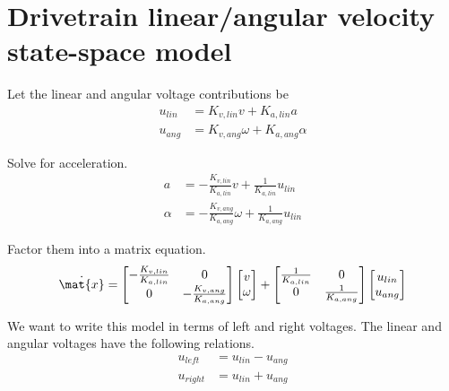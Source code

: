 \section{Drivetrain linear/angular velocity state-space model}

Let the linear and angular voltage contributions be
\begin{align*}
  u_{lin} &= K_{v,lin} v + K_{a,lin} a \\
  u_{ang} &= K_{v,ang} \omega + K_{a,ang} \alpha
\end{align*}

Solve for acceleration.
\begin{align*}
  a &= -\frac{K_{v,lin}}{K_{a,lin}} v + \frac{1}{K_{a,lin}} u_{lin} \\
  \alpha &= -\frac{K_{v,ang}}{K_{a,ang}} \omega + \frac{1}{K_{a,ang}} u_{lin}
\end{align*}

Factor them into a matrix equation.
\begin{equation*}
  \dot{\mat{x}} =
  \begin{bmatrix}
    -\frac{K_{v,lin}}{K_{a,lin}} & 0 \\
    0 & -\frac{K_{v,ang}}{K_{a,ang}}
  \end{bmatrix}
  \begin{bmatrix}
    v \\
    \omega
  \end{bmatrix} +
  \begin{bmatrix}
    \frac{1}{K_{a,lin}} & 0 \\
    0 & \frac{1}{K_{a,ang}}
  \end{bmatrix}
  \begin{bmatrix}
    u_{lin} \\
    u_{ang}
  \end{bmatrix}
\end{equation*}

We want to write this model in terms of left and right voltages. The linear and
angular voltages have the following relations.
\begin{align*}
  u_{left} &= u_{lin} - u_{ang} \\
  u_{right} &= u_{lin} + u_{ang}
\end{align*}

